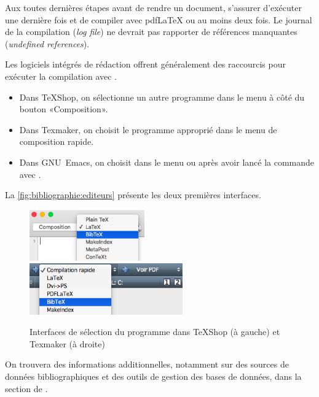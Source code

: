 \begin{conseil}
  Aux toutes dernières étapes avant de rendre un document, s'assurer
  d'exécuter {\BibTeX} une dernière fois et de compiler avec
  pdf{\LaTeX} ou {\XeLaTeX} au moins deux fois. Le journal de la
  compilation (\emph{log file}) ne devrait pas rapporter de références
  manquantes (\emph{undefined references}).
\end{conseil}

Les logiciels intégrés de rédaction offrent généralement des raccourcis pour exécuter la
compilation avec {\BibTeX}.
\begin{itemize}
\item Dans TeXShop, on sélectionne un autre programme dans le menu à
  côté du bouton «Composition».
\item Dans Texmaker, on choisit le programme approprié dans le menu de
  composition rapide.
\item Dans GNU~Emacs, on choisit  dans le menu
   ou après avoir lancé la commande
   avec .
\end{itemize}
La \autoref{fig:bibliographie:editeurs} présente les deux premières
interfaces.

\begin{figure}
  \centering
  \includegraphics[height=2.2cm]{bibtex-texshop}
  \qquad
  \includegraphics[height=2.2cm]{bibtex-texmaker}
  \caption{Interfaces de sélection du programme {\BibTeX} dans TeXShop
    (à gauche)
    et Texmaker (à droite)}
  \label{fig:bibliographie:editeurs}
\end{figure}

On trouvera des informations additionnelles, notamment sur des sources
de données bibliographiques et des outils de gestion des bases de
données, dans la section %
de \citeauthor{wikilivres:latex}.



